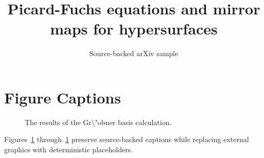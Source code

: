 \documentclass[11pt]{article}
\title{Picard-Fuchs equations and mirror maps for hypersurfaces}
\author{Source-backed arXiv sample}
\date{}
\begin{document}
\maketitle
\section{Figure Captions}

\begin{figure}[htbp]
\centering
\fbox{\rule{0pt}{1.15in}\rule{0.78\linewidth}{0pt}}
\caption{The results of the Gr\textbackslash{}"obner basis calculation.}
\label{fig:source-1}
\end{figure}


Figures~\ref{fig:source-1} through~\ref{fig:source-1} preserve source-backed captions while replacing external graphics with deterministic placeholders.
\end{document}
